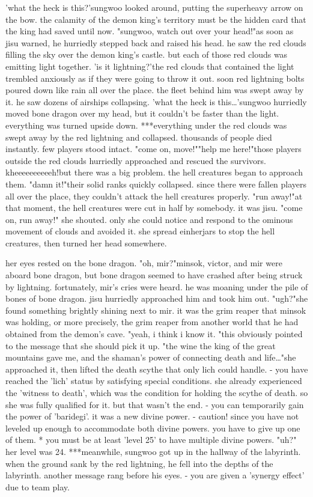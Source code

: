 'what the heck is this?'sungwoo looked around, putting the superheavy arrow on the bow.
 the calamity of the demon king's territory must be the hidden card that the king had saved until now.
"sungwoo, watch out over your head!"as soon as jisu warned, he hurriedly stepped back and raised his head.
he saw the red clouds filling the sky over the demon king's castle.
 but each of those red clouds was emitting light together.
'is it lightning?'the red clouds that contained the light trembled anxiously as if they were going to throw it out.
soon red lightning bolts poured down like rain all over the place.
 the fleet behind him was swept away by it.
 he saw dozens of airships collapsing.
'what the heck is this…'sungwoo hurriedly moved bone dragon over my head, but it couldn't be faster than the light.
everything was turned upside down.
***everything under the red clouds was swept away by the red lightning and collapsed.
 thousands of people died instantly.
 few players stood intact.
 "come on, move!""help me here!"those players outside the red clouds hurriedly approached and rescued the survivors.
kheeeeeeeeeeh!but there was a big problem.
 the hell creatures began to approach them.
"damn it!"their solid ranks quickly collapsed.
 since there were fallen players all over the place, they couldn't attack the hell creatures properly.
"run away!"at that moment, the hell creatures were cut in half by somebody.
it was jisu.
 "come on, run away!" she shouted.
 only she could notice and respond to the ominous movement of clouds and avoided it.
 she spread einherjars to stop the hell creatures, then turned her head somewhere.


her eyes rested on the bone dragon.
"oh, mir?"minsok, victor, and mir were aboard bone dragon, but bone dragon seemed to have crashed after being struck by lightning.
fortunately, mir's cries were heard.
 he was moaning under the pile of bones of bone dragon.
 jisu hurriedly approached him and took him out.
"ugh?"she found something brightly shining next to mir.
 it was the grim reaper that minsok was holding, or more precisely, the grim reaper from another world that he had obtained from the demon's cave.
 "yeah, i think i know it.
"this obviously pointed to the message that she should pick it up.
 "the wine the king of the great mountains gave me, and the shaman's power of connecting death and life…"she approached it, then lifted the death scythe that only lich could handle.
- you have reached the 'lich' status by satisfying special conditions.
she already experienced the 'witness to death', which was the condition for holding the scythe of death.
 so she was fully qualified for it.
but that wasn't the end.
- you can temporarily gain the power of 'baridegi'.
it was a new divine power.
 - caution! since you have not leveled up enough to accommodate both divine powers.
 you have to give up one of them.
* you must be at least 'level 25' to have multiple divine powers.
 "uh?" her level was 24.
***meanwhile, sungwoo got up in the hallway of the labyrinth.
 when the ground sank by the red lightning, he fell into the depths of the labyrinth.
another message rang before his eyes.
- you are given a 'synergy effect' due to team play.


 